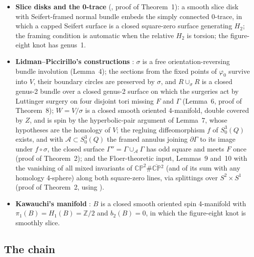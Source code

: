 \documentclass[11pt]{article}
\newcommand{\CP}{\mathbb{CP}}
\newcommand{\CPbar}{\CP^2\#\overline{\CP}{}^2}
\newcommand{\Z}{\mathbb{Z}}
\newcommand{\pione}{\pi_1}
\newcommand{\Ghat}{\widehat{\Gamma}}
\newcommand{\Gpp}{\Gamma''}
\theoremstyle{definition}
\begin{document}
\begin{itemize}
compact connected oriented 4-manifold with $\partial X$ an integer
homology sphere. Let $F^2$ be an orientable characteristic surface with
connected boundary that is properly embedded in $X$. Then
$\mathrm{Arf}(F)+\mathrm{Arf}(\partial F)=(\sigma(X)-[F]^2)/8+
\mu(\partial X) \pmod 2$.'' For spin $X$, characteristic means vanishing
in $H_2(X,\partial X;\Z/2)$. \textbf{Levine} \cite{Levine}:
$\mathrm{Arf}(K)=0$ iff $\Delta_K(-1)\equiv\pm1\pmod 8$.
\item \textbf{Slice disks and the 0-trace} (\cite{LidmanPiccirillo},
proof of Theorem~1): a smooth slice disk with Seifert-framed normal
bundle embeds the simply connected 0-trace, in which a capped Seifert
surface is a closed square-zero surface generating $H_2$; the framing
condition is automatic when the relative $H_2$ is torsion; the
figure-eight knot has genus~1.
\item \textbf{Lidman--Piccirillo's constructions}
\cite{LidmanPiccirillo}: $\sigma$ is a free orientation-reversing bundle
involution (Lemma~4); the sections from the fixed points of $\varphi_0$
survive into $V$, their boundary circles are preserved by $\sigma$, and
$R\cup_\sigma R$ is a closed genus-2 bundle over a closed genus-2 surface
on which the surgeries act by Luttinger surgery on four disjoint tori
missing $F$ and $\Ghat$ (Lemma~6, proof of Theorem~8); $W=V/\sigma$ is a
closed smooth oriented 4-manifold, double covered by $Z$, and is spin by
the hyperbolic-pair argument of Lemma~7, whose hypotheses are the
homology of $V$; the regluing diffeomorphism $f$ of $S^3_0(Q)$ exists,
and with $\mathcal A\subset S^3_0(Q)$ the framed annulus joining
$\partial\Gamma$ to its image under $f\circ\sigma$, the closed surface
$\Gpp=\Gamma\cup_{\mathcal A}\Gamma$ has odd square and meets $F$ once
(proof of Theorem~2); and the Floer-theoretic input, Lemmas~9
and~10 with the vanishing of all mixed invariants of $\CPbar$ (and of its
sum with any homology 4-sphere) along both square-zero lines, via
splittings over $S^2\times S^1$ (proof of Theorem~2, using
\cite{OS04,OS06}).
\item \textbf{Kawauchi's manifold} \cite{Kawauchi,LidmanPiccirillo}: $B$
is a closed smooth oriented spin 4-manifold with $\pione(B)=H_1(B)=\Z/2$
and $b_2(B)=0$, in which the figure-eight knot is smoothly slice.
\end{itemize}

\subsection*{The chain}
\end{document}
